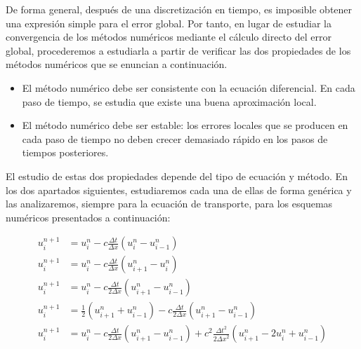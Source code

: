 De forma general, después de una discretización en tiempo, es
imposible obtener una expresión simple para el error global.
Por tanto, en lugar de estudiar la convergencia de los métodos
numéricos mediante el cálculo directo del error global, procederemos
a estudiarla a partir de verificar las dos propiedades de los métodos
numéricos que se enuncian a continuación.

\begin{itemize}
  \item

        El método numérico debe ser consistente con la ecuación
        diferencial.
        En cada paso de tiempo, se estudia que existe una buena
        aproximación local.

  \item

        El método numérico debe ser estable: los errores locales
        que se producen en cada paso de tiempo no deben crecer
        demasiado rápido en los pasos de tiempos posteriores.
\end{itemize}


El estudio de estas dos propiedades depende del tipo de ecuación y
método.
En los dos apartados siguientes, estudiaremos cada una de ellas de
forma genérica y las analizaremos, siempre para la ecuación de
transporte, para los esquemas numéricos presentados a continuación:

\begin{align}
  u^{n+1}_{i} & =
  u^{n}_{i}-
  c\frac{\Delta t}{\Delta x}
  \left(
  u^{n}_{i}-
  u^{n}_{i-1}
  \right)\label{eq:upwindscheme}         \\
  u^{n+1}_{i} & =
  u^{n}_{i}-
  c\frac{\Delta t}{\Delta x}
  \left(
  u^{n}_{i+1}-
  u^{n}_{i}
  \right)\label{eq:downwindscheme}         \\
  u^{n+1}_{i} & =
  u^{n}_{i}-
  c\frac{\Delta t}{2\Delta x}
  \left(
  u^{n}_{i+1}-u^{n}_{i-1}
  \right)\label{eq:ftcsscheme}         \\
  u^{n+1}_{i} & =
  \frac{1}{2}
  \left(
  u^{n}_{i+1}+
  u^{n}_{i-1}
  \right)-
  c\frac{\Delta t}{2\Delta x}
  \left(
  u^{n}_{i+1}-
  u^{n}_{i-1}
  \right)\label{eq:laxfriedrichsscheme}         \\
  u^{n+1}_{i} & =
  u^{n}_{i}-
  c\frac{\Delta t}{2\Delta x}
  \left(
  u^{n}_{i+1}-
  u^{n}_{i-1}
  \right)+
  c^{2}
  \frac{{\Delta t}^{2}}{2{\Delta x}^{2}}
  \left(
  u^{n}_{i+1}-
  2u^{n}_{i}+
  u^{n}_{i-1}
  \right)\label{eq:laxwendroffscheme}
\end{align}

